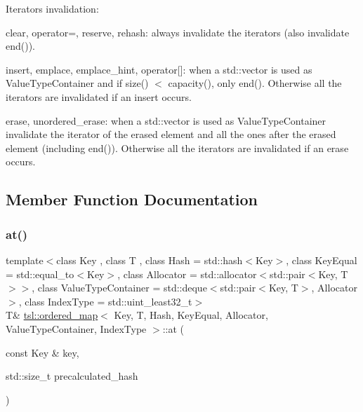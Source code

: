 Iterators invalidation\+:
\begin{DoxyItemize}
\item clear, operator=, reserve, rehash\+: always invalidate the iterators (also invalidate end()).
\item insert, emplace, emplace\+\_\+hint, operator\mbox{[}\mbox{]}\+: when a std\+::vector is used as Value\+Type\+Container and if size() $<$ capacity(), only end(). Otherwise all the iterators are invalidated if an insert occurs.
\item erase, unordered\+\_\+erase\+: when a std\+::vector is used as Value\+Type\+Container invalidate the iterator of the erased element and all the ones after the erased element (including end()). Otherwise all the iterators are invalidated if an erase occurs. 
\end{DoxyItemize}

\subsection{Member Function Documentation}
\mbox{\label{classtsl_1_1ordered__map_a7154dccbdf1947e72fa56072e0155f81}} 
\subsubsection{\texorpdfstring{at()}{at()}\hspace{0.1cm}{\footnotesize\ttfamily [1/6]}}
{\footnotesize\ttfamily template$<$class Key , class T , class Hash  = std\+::hash$<$\+Key$>$, class Key\+Equal  = std\+::equal\+\_\+to$<$\+Key$>$, class Allocator  = std\+::allocator$<$std\+::pair$<$\+Key, T$>$$>$, class Value\+Type\+Container  = std\+::deque$<$std\+::pair$<$\+Key, T$>$, Allocator$>$, class Index\+Type  = std\+::uint\+\_\+least32\+\_\+t$>$ \\
T\& \mbox{\hyperlink{classtsl_1_1ordered__map}{tsl\+::ordered\+\_\+map}}$<$ Key, T, Hash, Key\+Equal, Allocator, Value\+Type\+Container, Index\+Type $>$\+::at (\begin{DoxyParamCaption}\item[{const Key \&}]{key,  }\item[{std\+::size\+\_\+t}]{precalculated\+\_\+hash }\end{DoxyParamCaption})\hspace{0.3cm}{\ttfamily [inline]}}

